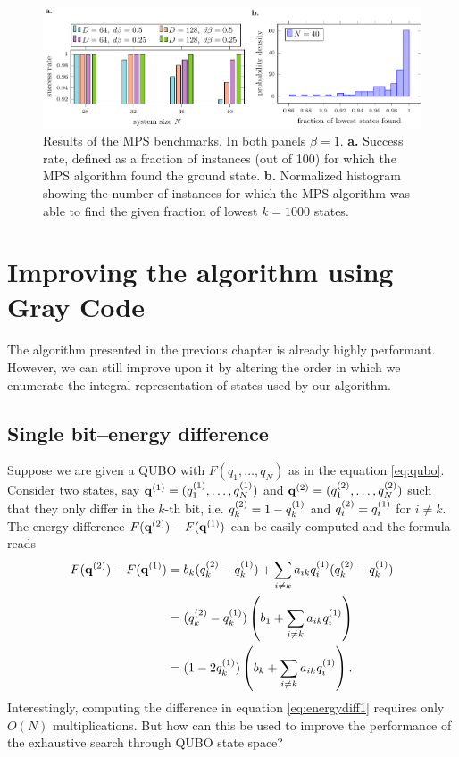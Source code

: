 \begin{figure}[th]
  \includegraphics[width=\textwidth]{figures/mps_benchmark}
  \caption{Results of the MPS benchmarks. In both panels $\beta=1$. \textbf{a.} Success
    rate, defined as a fraction of instances (out of 100) for which the MPS
    algorithm found the ground state. \textbf{b.} Normalized histogram showing the
    number of instances for which the MPS algorithm was able to find the given
    fraction of lowest $k=1000$ states.} \label{fig:mpsbench}
\end{figure}

\section{Improving the algorithm using Gray Code}

The algorithm presented in the previous chapter is already highly performant.
However, we can still improve upon it by altering the order in which we
enumerate the integral representation of states used by our algorithm.

\subsection{Single bit--energy difference}
Suppose we are given a QUBO with $F(q_{1},\ldots,q_{N})$ as in the equation
\eqref{eq:qubo}. Consider two states, say $\mathbf{q}^{(1)} =
  (q^{(1)}_{1},\ldots,q^{(1)}_{N})$ and $\mathbf{q}^{(2)}=(q^{(2)}_{1},\ldots,q^{(2)}_{N})$ such
    that they only differ in the $k$-th bit, i.e. $q^{(2)}_{k}=1-q^{(1)}_{k}$ and
  $q^{(2)}_{i}=q^{(1)}_{i}$ for $i \ne k$. The energy difference
  $F(\mathbf{q}^{(2)})-F(\mathbf{q}^{(1)})$ can be easily computed and the formula reads
\begin{align}
  \begin{split}
    \label{eq:energydiff1}
    F(\mathbf{q}^{(2)})-F(\mathbf{q}^{(1)}) &= b_{k}(q^{(2)}_{k}-q^{(1)}_{k}) + \sum_{i\ne k}a_{ik}q^{(1)}_{i}(q^{(2)}_{k} - q^{(1)}_{k}) \\
    &= (q^{(2)}_{k}-q^{(1)}_{k}) \left(b_{1} + \sum_{i \ne k}a_{ik}q^{(1)}_{i}\right) \\
    & = (1-2q^{(1)}_{k}) \left(b_{k} + \sum_{i \ne k}a_{ik}q^{(1)}_{i}\right).
  \end{split}
\end{align}
Interestingly, computing the difference in equation \eqref{eq:energydiff1}
requires only $O(N)$ multiplications. But how can this be used to improve the
performance of the exhaustive search through QUBO state space?


